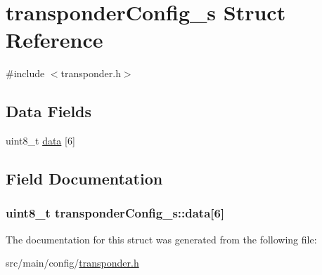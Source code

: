 \hypertarget{structtransponderConfig__s}{\section{transponder\+Config\+\_\+s Struct Reference}
\label{structtransponderConfig__s}
}


{\ttfamily \#include $<$transponder.\+h$>$}

\subsection*{Data Fields}
\begin{DoxyCompactItemize}
\item 
uint8\+\_\+t \hyperlink{structtransponderConfig__s_a0f503d2592609577ae5622b301ec2f9a}{data} \mbox{[}6\mbox{]}
\end{DoxyCompactItemize}


\subsection{Field Documentation}
\hypertarget{structtransponderConfig__s_a0f503d2592609577ae5622b301ec2f9a}{
\subsubsection[{data}]{\setlength{\rightskip}{0pt plus 5cm}uint8\+\_\+t transponder\+Config\+\_\+s\+::data\mbox{[}6\mbox{]}}}\label{structtransponderConfig__s_a0f503d2592609577ae5622b301ec2f9a}


The documentation for this struct was generated from the following file\+:\begin{DoxyCompactItemize}
\item 
src/main/config/\hyperlink{transponder_8h}{transponder.\+h}\end{DoxyCompactItemize}
